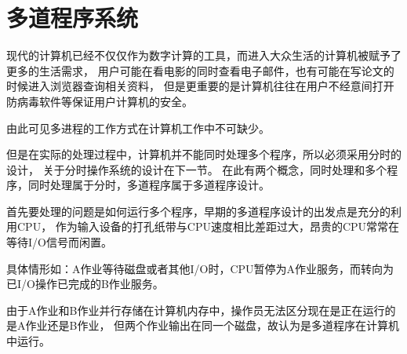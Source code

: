 \section{多道程序系统}

现代的计算机已经不仅仅作为数字计算的工具，而进入大众生活的计算机被赋予了更多的生活需求，
用户可能在看电影的同时查看电子邮件，也有可能在写论文的时候进入浏览器查询相关资料，
但是更重要的是计算机往往在用户不经意间打开防病毒软件等保证用户计算机的安全。

由此可见多进程的工作方式在计算机工作中不可缺少。

但是在实际的处理过程中，计算机并不能同时处理多个程序，所以必须采用分时的设计，
关于分时操作系统的设计在下一节。
在此有两个概念，同时处理和多个程序，同时处理属于分时，多道程序属于多道程序设计。

首先要处理的问题是如何运行多个程序，早期的多道程序设计的出发点是充分的利用CPU，
作为输入设备的打孔纸带与CPU速度相比差距过大，昂贵的CPU常常在等待I/O信号而闲置。

具体情形如：A作业等待磁盘或者其他I/O时，CPU暂停为A作业服务，而转向为已I/O操作已完成的B作业服务。

由于A作业和B作业并行存储在计算机内存中，操作员无法区分现在是正在运行的是A作业还是B作业，
但两个作业输出在同一个磁盘，故认为是多道程序在计算机中运行。

